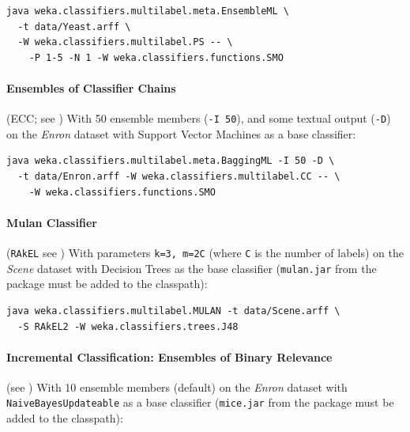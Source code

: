 \documentclass[11pt]{article}
\newcommand{\MEKA}{Meka}
\newcommand{\MULAN}{Mulan}
\begin{document}
\begin{verbatim}
java weka.classifiers.multilabel.meta.EnsembleML \
  -t data/Yeast.arff \
  -W weka.classifiers.multilabel.PS -- \
    -P 1-5 -N 1 -W weka.classifiers.functions.SMO
\end{verbatim}

\paragraph{Ensembles of Classifier Chains} (ECC; see \cite{ECC2}) With 50 ensemble members (\texttt{-I 50}), and some textual output (\texttt{-D}) on the \textit{Enron} dataset with Support Vector Machines as a base classifier:
\begin{verbatim}
java weka.classifiers.multilabel.meta.BaggingML -I 50 -D \
  -t data/Enron.arff -W weka.classifiers.multilabel.CC -- \
    -W weka.classifiers.functions.SMO
\end{verbatim}

\paragraph{Mulan Classifier} (\texttt{RAkEL} see \cite{RAKEL}) With parameters \texttt{\texttt{k=3}, \texttt{m=2C}} (where \texttt{C} is the number of labels) on the \textit{Scene} dataset with Decision Trees as the base classifier ({\texttt{mulan.jar} from the \framework{\MULAN} package must be added to the classpath}):
\begin{verbatim}
java weka.classifiers.multilabel.MULAN -t data/Scene.arff \ 
  -S RAkEL2 -W weka.classifiers.trees.J48
\end{verbatim}



\paragraph{Incremental Classification: Ensembles of Binary Relevance} (see \cite{ECC2,MEDS2}) With 10 ensemble members (default) on the \textit{Enron} dataset with \texttt{NaiveBayesUpdateable} as a base classifier (\texttt{mice.jar} from the \framework{\MEKA} package must be added to the classpath):
\end{document}
